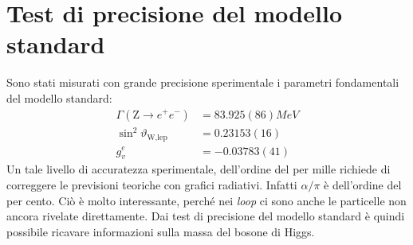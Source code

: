 \documentclass[italian,a4paper]{article}
\theoremstyle{definition}
\newcommand{\zboson}{\ensuremath{\mathrm{Z}}}
\newcommand{\wboson}{\ensuremath{\mathrm{W}}}
\renewcommand{\theta}{\vartheta}
\begin{document}
\section{Test di precisione del modello standard}
Sono stati misurati con grande precisione sperimentale i parametri
fondamentali del modello standard:
\begin{align*}
    \Gamma(\zboson \rightarrow e^+ e^-) &= 83.925(86) MeV\\
    \sin^2\theta_{\wboson\text{,lep}} &= 0.23153(16)\\
    g_{v}^{e} &=  -0.03783(41)
\end{align*}
Un tale livello di accuratezza sperimentale, dell'ordine del per mille
richiede di correggere le previsioni teoriche con grafici radiativi. Infatti
$\alpha/\pi$ \`e dell'ordine del per cento.
Ci\`o \`e molto interessante, perch\'e nei \emph{loop} ci sono anche le
particelle non ancora rivelate direttamente. Dai test di precisione del
modello standard \`e quindi possibile ricavare informazioni sulla massa del
bosone di Higgs.
\end{document}
